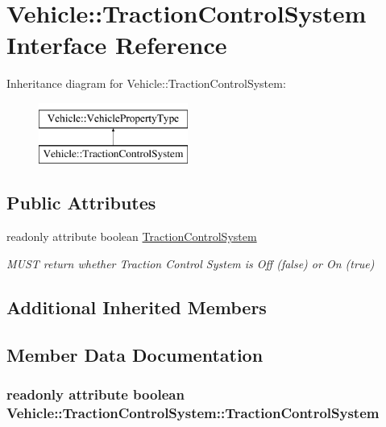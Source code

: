 \hypertarget{interfaceVehicle_1_1TractionControlSystem}{\section{Vehicle\-:\-:Traction\-Control\-System Interface Reference}
\label{interfaceVehicle_1_1TractionControlSystem}
}
Inheritance diagram for Vehicle\-:\-:Traction\-Control\-System\-:\begin{figure}[H]
\begin{center}
\leavevmode
\includegraphics[height=2.000000cm]{interfaceVehicle_1_1TractionControlSystem}
\end{center}
\end{figure}
\subsection*{Public Attributes}
\begin{DoxyCompactItemize}
\item 
readonly attribute boolean \hyperlink{interfaceVehicle_1_1TractionControlSystem_a05b1dd2f4b5135d41d9740a5715706b5}{Traction\-Control\-System}
\begin{DoxyCompactList}\small\item\em M\-U\-S\-T return whether Traction Control System is Off (false) or On (true) \end{DoxyCompactList}\end{DoxyCompactItemize}
\subsection*{Additional Inherited Members}


\subsection{Member Data Documentation}
\hypertarget{interfaceVehicle_1_1TractionControlSystem_a05b1dd2f4b5135d41d9740a5715706b5}{
\subsubsection[{Traction\-Control\-System}]{\setlength{\rightskip}{0pt plus 5cm}readonly attribute boolean Vehicle\-::\-Traction\-Control\-System\-::\-Traction\-Control\-System}}\label{interfaceVehicle_1_1TractionControlSystem_a05b1dd2f4b5135d41d9740a5715706b5}


